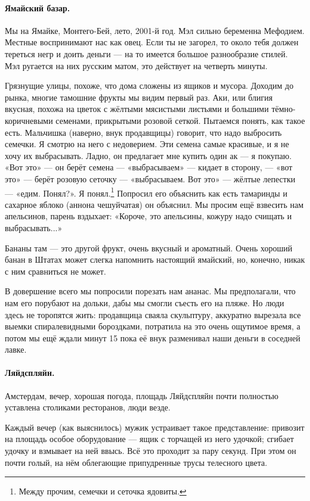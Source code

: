 \documentclass{book}
\begin{document}
\paragraph{Ямайский базар.}
Мы на Ямайке, Монтего-Бей, лето, 2001-й год.
Мэл сильно беременна Мефодием.
Местные воспринимают нас как овец.
Если ты не загорел, то около тебя должен тереться негр и доить деньги --- на то имеется большое разнообразие стилей.
Мэл ругается на них русским матом, это действует на четверть минуты.

Грязнущие улицы, похоже, что дома сложены из ящиков и мусора.
Доходим до рынка, многие тамошние фрукты мы видим первый раз.
Аки, или блигия вкусная, похожа на цветок с жёлтыми мясистыми листьями и большими тёмно-коричневыми семенами, прикрытыми розовой сеткой.
Пытаемся понять, как такое есть.
Мальчишка (наверно, внук продавщицы) говорит, что надо выбросить семечки.
Я смотрю на него с недоверием.
Эти семена самые красивые, и я не хочу их выбрасывать.
Ладно, он предлагает мне купить один ак --- я покупаю.
«Вот это» --- он берёт семена --- «выбрасываем» --- кидает в сторону, ---  «вот это» --- берёт розовую сеточку --- «выбрасываем. Вот это» --- жёлтые лепестки --- «едим. Понял?».
Я понял.\footnote{Между прочим, семечки и сеточка ядовиты.}
Попросил его объяснить как есть тамаринды и сахарное яблоко (аннона чешуйчатая) он объяснил.
Мы просим ещё взвесить нам апельсинов, парень вздыхает: «Короче, это апельсины, кожуру надо счищать и выбрасывать...» 

Бананы там --- это другой фрукт, очень вкусный и ароматный.
Очень хороший банан в Штатах может слегка напомнить настоящий ямайский, но, конечно, никак с ним сравниться не может.

В довершение всего мы попросили порезать нам ананас.
Мы предполагали, что нам его порубают на дольки, дабы мы смогли съесть его на пляже.
Но люди здесь не торопятся жить:
продавщица сваяла скульптуру, аккуратно вырезала все выемки спиралевидными бороздками, потратила на это очень ощутимое время, а потом мы ещё ждали минут 15 пока её внук разменивал наши деньги в соседней лавке.

\paragraph{Ляйдспляйн.}  
Амстердам, вечер, хорошая погода, площадь Ляйдспляйн почти полностью уставлена столиками ресторанов, люди везде.

Каждый вечер (как выяснилось) мужик устраивает такое представление:
привозит на площадь особое оборудование --- ящик с торчащей из него удочкой;
сгибает удочку и взмывает на ней ввысь.
Всё это проходит за пару секунд.
При этом он почти голый, на нём облегающие припудренные трусы телесного цвета.
\end{document}
